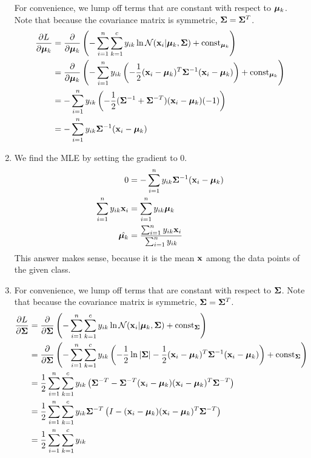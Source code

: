 \documentclass[submit]{harvardml}
\begin{document}
\begin{solution}
\begin{sol}
\begin{enumerate}
For convenience, we lump off terms that are constant with respect to $\boldsymbol{\mu}_k$.
Note that because the covariance matrix is symmetric, $\mathbf{\Sigma} = \mathbf{\Sigma}^T$.
\begin{align*}
\frac{\partial L}{\partial \boldsymbol{\mu}_k} &=
\frac{\partial}{\partial \boldsymbol{\mu}_k}\left(
- \sum_{i=1}^n \sum_{k=1}^c y_{ik} \ln \mathcal{N}(\mathbf{x}_i |  \boldsymbol{\mu}_k, \mathbf{\Sigma})
+ \textrm{const}_{\boldsymbol{\mu}_k}\right)\\
&= \frac{\partial}{\partial \boldsymbol{\mu}_k}\left(
- \sum_{i=1}^n y_{ik} \left(-\frac12 (\mathbf{x}_i-\boldsymbol{\mu}_k)^T \mathbf{\Sigma}^{-1} (\mathbf{x}_i-\boldsymbol{\mu}_k) \right)
+ \textrm{const}_{\boldsymbol{\mu}_k}\right)\\
&= - \sum_{i=1}^n y_{ik} \left(-\frac12 (\mathbf{\Sigma}^{-1} + \mathbf{\Sigma}^{-T}) (\mathbf{x}_i-\boldsymbol{\mu}_k) (-1) \right)\\
&= - \sum_{i=1}^n y_{ik} \mathbf{\Sigma}^{-1} (\mathbf{x}_i-\boldsymbol{\mu}_k)
\end{align*}
%
\item
We find the MLE by setting the gradient to 0.
\begin{align*}
0 &= - \sum_{i=1}^n y_{ik} \mathbf{\Sigma}^{-1} (\mathbf{x}_i-\boldsymbol{\mu}_k)\\
\sum_{i=1}^n y_{ik} \mathbf{x}_i &= \sum_{i=1}^n y_{ik} \boldsymbol{\mu}_k\\
\hat{\boldsymbol{\mu}_k} &= \frac{\sum_{i=1}^n y_{ik} \mathbf{x}_i}{\sum_{i=1}^n y_{ik}}
\end{align*}
This answer makes sense, because it is the mean $\mathbf{x}$ among the data points of the given class.
%
\item
For convenience, we lump off terms that are constant with respect to $\mathbf{\Sigma}$.
Note that because the covariance matrix is symmetric, $\mathbf{\Sigma} = \mathbf{\Sigma}^T$.
\begin{align*}
\frac{\partial L}{\partial \bSigma} &=
\frac{\partial}{\partial \bSigma}\left(
- \sum_{i=1}^n \sum_{k=1}^c y_{ik} \ln \mathcal{N}(\boldx_i |  \bmu_k, \bSigma)
+ \textrm{const}_{\bSigma}\right)\\
&= \frac{\partial}{\partial \bSigma}\left(
- \sum_{i=1}^n \sum_{k=1}^c y_{ik} \left(-\frac12 \ln |\bSigma| -\frac12 (\boldx_i-\bmu_k)^T \bSigma^{-1} (\boldx_i-\bmu_k) \right)
+ \textrm{const}_{\bSigma}\right)\\
&= \frac12 \sum_{i=1}^n \sum_{k=1}^c y_{ik}
\left( \bSigma^{-T} - \bSigma^{-T} (\boldx_i-\bmu_k) (\boldx_i-\bmu_k)^T \bSigma^{-T}\right)\\
&= \frac12 \sum_{i=1}^n \sum_{k=1}^c y_{ik}
\bSigma^{-T} \left(I - (\boldx_i-\bmu_k) (\boldx_i-\bmu_k)^T \bSigma^{-T}\right)\\
&= \frac12 \sum_{i=1}^n \sum_{k=1}^c y_{ik}

\end{align*}
\end{enumerate}
\end{sol}
\end{solution}
\end{document}
